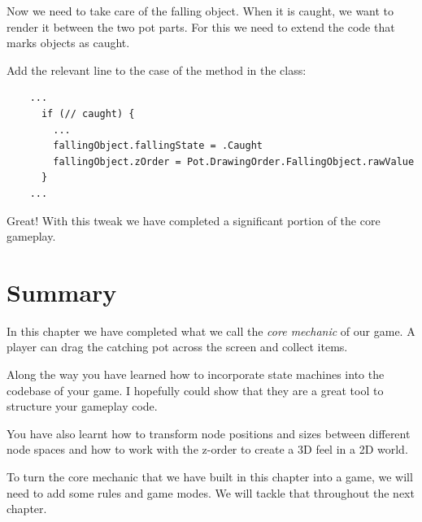 Now we need to take care of the falling object. When it is caught, we want to
render it between the two pot parts. For this we need to extend the code that
marks objects as caught.
\begin{leftbar}
Add the relevant line to the  case of the
 method in the  class:
\begin{lstlisting}
    ...
      if (// caught) {
        ...
        fallingObject.fallingState = .Caught
        fallingObject.zOrder = Pot.DrawingOrder.FallingObject.rawValue
      }
    ...
\end{lstlisting}
\end{leftbar}
Great! With this tweak we have completed a significant portion of the core
gameplay.

\section{Summary} 
In this chapter we have completed what we call the \textit{core mechanic} of
our game. A player can drag the catching pot across the screen and collect
items.

Along the way you have learned how to incorporate state machines into the
codebase of your game. I hopefully could show that they are a great tool to
structure your gameplay code. 

You have also learnt how to transform node positions
and sizes between different node spaces and how to work with the z-order to
create a 3D feel in a 2D world.

To turn the core mechanic that we have built in this chapter into a game, we
will need to add some rules and game modes. We will tackle that throughout the
next chapter.
